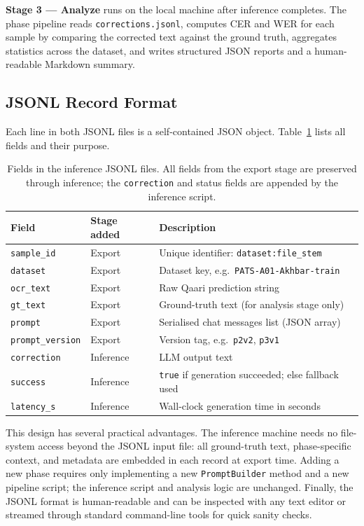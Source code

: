 \textbf{Stage 3 --- Analyze} runs on the local machine after inference completes.
The phase pipeline reads \texttt{corrections.jsonl}, computes CER and WER for each
sample by comparing the corrected text against the ground truth, aggregates
statistics across the dataset, and writes structured JSON reports and a
human-readable Markdown summary.

\subsection{JSONL Record Format}
\label{subsec:jsonl}

Each line in both JSONL files is a self-contained JSON object.
Table~\ref{tab:jsonl} lists all fields and their purpose.

\begin{table}[ht]
\caption{Fields in the inference JSONL files. All fields from the export stage are
         preserved through inference; the \texttt{correction} and status fields are
         appended by the inference script.}
\label{tab:jsonl}
\centering
\renewcommand{\arraystretch}{1.3}
\begin{tabular}{lll}
\toprule
\textbf{Field} & \textbf{Stage added} & \textbf{Description} \\
\midrule
\texttt{sample\_id}      & Export    & Unique identifier: \texttt{dataset:file\_stem} \\
\texttt{dataset}         & Export    & Dataset key, e.g.\ \texttt{PATS-A01-Akhbar-train} \\
\texttt{ocr\_text}       & Export    & Raw Qaari prediction string \\
\texttt{gt\_text}        & Export    & Ground-truth text (for analysis stage only) \\
\texttt{prompt}          & Export    & Serialised chat messages list (JSON array) \\
\texttt{prompt\_version} & Export    & Version tag, e.g.\ \texttt{p2v2}, \texttt{p3v1} \\
\texttt{correction}      & Inference & LLM output text \\
\texttt{success}         & Inference & \texttt{true} if generation succeeded; else fallback used \\
\texttt{latency\_s}      & Inference & Wall-clock generation time in seconds \\
\bottomrule
\end{tabular}
\end{table}

\noindent
This design has several practical advantages.
The inference machine needs no file-system access beyond the JSONL input file:
all ground-truth text, phase-specific context, and metadata are embedded in each
record at export time.
Adding a new phase requires only implementing a new \texttt{PromptBuilder} method
and a new pipeline script; the inference script and analysis logic are unchanged.
Finally, the JSONL format is human-readable and can be inspected with any text
editor or streamed through standard command-line tools for quick sanity checks.

